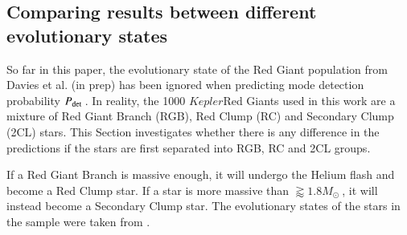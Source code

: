 \documentclass[a4paper,fleqn,usenatbib,useAMS]{mnras}
\newcommand{\teff}{\ensuremath{T_{\textrm{eff}}\:}}
\newcommand{\kep}{\ensuremath{Kepler}\:}
\newcommand{\pdet}{\ensuremath{P_{\rm det}\:}}
\newcommand{\imag}{\ensuremath{I_{\textrm{mag}}\:}}
\newcommand{\msol}{\ensuremath{M_{\odot}\:}}
\begin{document}

\subsection{Comparing results between different evolutionary states}
\label{sect: evo states}

So far in this paper, the evolutionary state of the Red Giant population from Davies et al. (in prep) has been ignored when predicting mode detection probability \pdet. In reality, the 1000 \kep Red Giants used in this work are a mixture of Red Giant Branch (RGB), Red Clump (RC) and Secondary Clump (2CL) stars. This Section investigates whether there is any difference in the predictions if the stars are first separated into RGB, RC and 2CL groups.

If a Red Giant Branch is massive enough, it will undergo the Helium flash and become a Red Clump star. If a star is more massive than $\gtrapprox1.8\msol$, it will instead become a Secondary Clump star. The evolutionary states of the stars in the sample were taken from \citet{elsworth_new_2017}.
\end{document}
